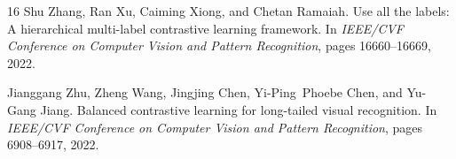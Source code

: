 \documentclass{article}
\begin{document}
\begin{thebibliography}{16}
Shu Zhang, Ran Xu, Caiming Xiong, and Chetan Ramaiah.
\newblock Use all the labels: A hierarchical multi-label contrastive learning framework.
\newblock In \emph{IEEE/CVF Conference on Computer Vision and Pattern Recognition}, pages 16660--16669, 2022.

Jianggang Zhu, Zheng Wang, Jingjing Chen, Yi-Ping~Phoebe Chen, and Yu-Gang Jiang.
\newblock Balanced contrastive learning for long-tailed visual recognition.
\newblock In \emph{IEEE/CVF Conference on Computer Vision and Pattern Recognition}, pages 6908--6917, 2022.

\end{thebibliography}
\end{document}
